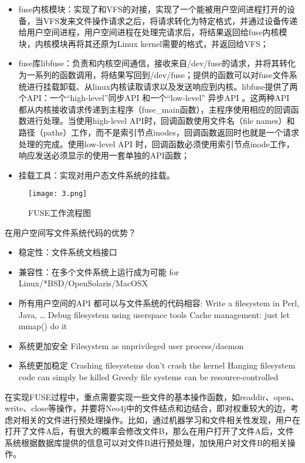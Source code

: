 \documentclass[UTF8]{ctexart}
\begin{document}
\begin{itemize}
  \item fuse内核模块：实现了和VFS的对接，实现了一个能被用户空间进程打开的设备，当VFS发来文件操作请求之后，将请求转化为特定格式，并通过设备传递给用户空间进程，用户空间进程在处理完请求后，将结果返回给fuse内核模块，内核模块再将其还原为Linux kernel需要的格式，并返回给VFS；
  \item fuse库libfuse：负责和内核空间通信，接收来自/dev/fuse的请求，并将其转化为一系列的函数调用，将结果写回到/dev/fuse；提供的函数可以对fuse文件系统进行挂载卸载、从linux内核读取请求以及发送响应到内核。libfuse提供了两个API：一个“high-level”同步API 和一个“low-level” 异步API 。这两种API 都从内核接收请求传递到主程序（fuse\_main函数），主程序使用相应的回调函数进行处理。当使用high-level API时，回调函数使用文件名（file names）和路径（paths）工作，而不是索引节点inodes，回调函数返回时也就是一个请求处理的完成。使用low-level API 时，回调函数必须使用索引节点inode工作，响应发送必须显示的使用一套单独的API函数；
\item 挂载工具：实现对用户态文件系统的挂载。
\end{itemize}

\begin{figure}[htbp]
\centering\texttt{[image: 3.png]}
\caption{FUSE工作流程图}
\end{figure}

在用户空间写文件系统代码的优势？

\begin{itemize}
  \item 稳定性：文件系统文档接口
  \item 兼容性：在多个文件系统上运行成为可能
    \subitem for Linux/*BSD/OpenSolaris/MacOSX
  \item 所有用户空间的API 都可以与文件系统的代码相容:
    \subitem Write a filesystem in Perl, Java, …
    \subitem Debug filesystem using userspace tools
    \subitem Cache management: just let mmap() do it
  \item 系统更加安全
    \subitem Filesystem as unprivileged user process/daemon
  \item 系统更加稳定
    \subitem Crashing filesystems don't crash the kernel
    \subitem Hanging filesystem code can simply be killed
    \subitem Greedy file systems can be resource-controlled
\end{itemize}

在实现FUSE过程中，重点需要实现一些文件的基本操作函数，如readdir、open、write、close等操作，并要将Neo4j中的文件结点和边结合，即对权重较大的边，考虑对相关的文件进行预处理操作。比如，通过机器学习和文件相关性发现，用户在打开了文件A后，有很大的概率会修改文件B，那么在用户打开了文件A后，文件系统根据数据库提供的信息可以对文件B进行预处理，加快用户对文件B的相关操作。
\end{document}
